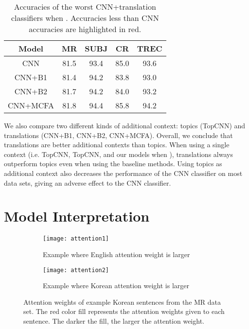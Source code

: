 \documentclass{article}
\begin{document}
\begin{table}[t]
	\scriptsize
  \centering
    \begin{tabular}{|c|c|c|c|c|}
    \hline
    \textbf{Model} & {\textbf{MR}} & \textbf{SUBJ} & \textbf{CR} & {\textbf{TREC}} \\
    \hline
    CNN   & 81.5  & 93.4  & 85.0    & 93.6 \\
    \hline
    CNN+B1 & \textcolor[rgb]{ 1,  0,  0}{81.4} & 94.2  & \textcolor[rgb]{ 1,  0,  0}{83.8} & \textcolor[rgb]{ 1,  0,  0}{93.0} \\
    CNN+B2 & 81.7  & 94.2  & \textcolor[rgb]{ 1,  0,  0}{84.0} & \textcolor[rgb]{ 1,  0,  0}{93.2} \\
    CNN+MCFA & 81.8  & 94.4  & 85.8  & 94.2 \\
    \hline
    \end{tabular}\caption{Accuracies of the worst CNN+translation classifiers when . Accuracies less than CNN accuracies are highlighted in \textcolor[rgb]{1,0,0}{red}.}
  \label{tab:minresult}\end{table}

We also compare two different kinds of additional context: topics (TopCNN) and translations (CNN+B1, CNN+B2, CNN+MCFA). Overall, we conclude that translations are better additional contexts than topics. When using a single context (i.e. TopCNN, TopCNN, and our models when ), translations always outperform topics even when using the baseline methods. Using topics as additional context also decreases the performance of the CNN classifier on most data sets, giving an adverse effect to the CNN classifier.



\section{Model Interpretation}

\begin{figure}[t]
	\centering
	\begin{subfigure}{0.4\textwidth}
		\centering
		\texttt{[image: attention1]}
		\caption{Example where English attention weight is larger}
	\end{subfigure}
	\begin{subfigure}{0.4\textwidth}
		\centering
		\texttt{[image: attention2]}
		\caption{Example where Korean attention weight is larger}
	\end{subfigure}
	\caption{Attention weights of example Korean sentences from the MR data set. The red color fill represents the attention weights given to each sentence. The darker the fill, the larger the attention weight.}
	\label{fig:attention}
\end{figure}
\end{document}
